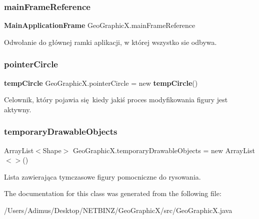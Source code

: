 \subsubsection{main\+Frame\+Reference}
{\footnotesize\ttfamily \textbf{ Main\+Application\+Frame} Geo\+Graphic\+X.\+main\+Frame\+Reference}

Odwołanie do głównej ramki aplikacji, w której wszystko sie odbywa. \mbox{\label{class_geo_graphic_x_a9000101765183c1fb3e4a69b866cb45d}} 
\subsubsection{pointer\+Circle}
{\footnotesize\ttfamily \textbf{ temp\+Circle} Geo\+Graphic\+X.\+pointer\+Circle = new \textbf{ temp\+Circle}()}

Celownik, który pojawia się kiedy jakiś proces modyfikowania figury jest aktywny. \mbox{\label{class_geo_graphic_x_a8762800b9c7eaf083f30f7dec13921e3}} 
\subsubsection{temporary\+Drawable\+Objects}
{\footnotesize\ttfamily Array\+List$<$Shape$>$ Geo\+Graphic\+X.\+temporary\+Drawable\+Objects = new Array\+List$<$$>$()}

Lista zawierająca tymczasowe figury pomocniczne do rysowania. 

The documentation for this class was generated from the following file\+:\begin{DoxyCompactItemize}
\item 
/\+Users/\+Adimus/\+Desktop/\+N\+E\+T\+B\+I\+N\+Z/\+Geo\+Graphic\+X/src/Geo\+Graphic\+X.\+java\end{DoxyCompactItemize}
